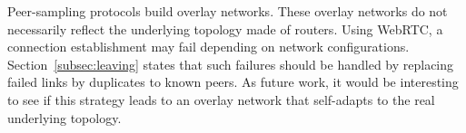 Peer-sampling protocols build overlay networks. These overlay networks do not
necessarily reflect the underlying topology made of routers. Using WebRTC, a
connection establishment may fail depending on network
configurations. Section~\ref{subsec:leaving} states that such failures should be
handled by replacing failed links by duplicates to known peers. As future work,
it would be interesting to see if this strategy leads to an overlay network that
self-adapts to the real underlying topology.


